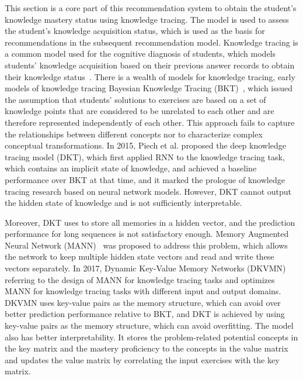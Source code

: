 This section is a core part of this recommendation system to obtain the student's knowledge mastery status using knowledge tracing. The model is used to assess the student's knowledge acquisition status, which is used as the basis for recommendations in the subsequent recommendation model. Knowledge tracing is a common model used for the cognitive diagnosis of students, which models students' knowledge acquisition based on their previous answer records to obtain their knowledge status~\cite{gonzalez2014general}. There is a wealth of models for knowledge tracing, early models of knowledge tracing Bayesian Knowledge Tracing (BKT)~\cite{yudelson2013individualized}, which issued the assumption that students' solutions to exercises are based on a set of knowledge points that are considered to be unrelated to each other and are therefore represented independently of each other. This approach fails to capture the relationships between different concepts nor to characterize complex conceptual transformations. In 2015, Piech et al. proposed the deep knowledge tracing model (DKT), which first applied RNN to the knowledge tracing task, which contains an implicit state of knowledge, and achieved a baseline performance over BKT at that time, and it marked the prologue of knowledge tracing research based on neural network models. However, DKT cannot output the hidden state of knowledge and is not sufficiently interpretable.

Moreover, DKT uses to store all memories in a hidden vector, and the prediction performance for long sequences is not satisfactory enough. Memory Augmented Neural Network (MANN)~\cite{santoro2016meta} was proposed to address this problem, which allows the network to keep multiple hidden state vectors and read and write these vectors separately. In 2017, Dynamic Key-Value Memory Networks (DKVMN)~\cite{zhang2017dynamic} referring to the design of MANN for knowledge tracing tasks and optimizes MANN for knowledge tracing tasks with different input and output domains. DKVMN uses key-value pairs as the memory structure, which can avoid over better prediction performance relative to BKT, and DKT is achieved by using key-value pairs as the memory structure, which can avoid overfitting. The model also has better interpretability. It stores the problem-related potential concepts in the key matrix and the mastery proficiency to the concepts in the value matrix and updates the value matrix by correlating the input exercises with the key matrix.


